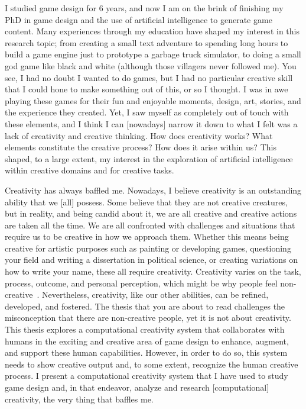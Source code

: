 I studied game design for 6 years, and now I am on the brink of finishing my PhD in game design and the use of artificial intelligence to generate game content. Many experiences through my education have shaped my interest in this research topic; from creating a small text adventure to spending long hours to build a game engine just to prototype a garbage truck simulator, to doing a small god game like black and white (although those villagers never followed me). You see, I had no doubt I wanted to do games, but I had no particular creative skill that I could hone to make something out of this, or so I thought. I was in awe playing these games for their fun and enjoyable moments, design, art, stories, and the experience they created. Yet, I saw myself as completely out of touch with these elements, and I think I can [nowadays] narrow it down to what I felt was a lack of creativity and creative thinking. How does creativity works? What elements constitute the creative process? How does it arise within us? This shaped, to a large extent, my interest in the exploration of artificial intelligence within creative domains and for creative tasks.

Creativity has always baffled me. Nowadays, I believe creativity is an outstanding ability that we [all] possess. Some believe that they are not creative creatures, but in reality, and being candid about it, we are all creative and creative actions are taken all the time. We are all confronted with challenges and situations that require us to be creative in how we approach them. Whether this means being creative for artistic purposes such as painting or developing games, questioning your field and writing a dissertation in political science, or creating variations on how to write your name, these all require creativity. Creativity varies on the task, process, outcome, and personal perception, which might be why people feel non-creative~\cite{kaufman_beyond_2009}. Nevertheless, creativity, like our other abilities, can be refined, developed, and fostered. The thesis that you are about to read challenges the misconception that there are non-creative people, yet it is not about creativity. This thesis explores a computational creativity system that collaborates with humans in the exciting and creative area of game design to enhance, augment, and support these human capabilities. However, in order to do so, this system needs to show creative output and, to some extent, recognize the human creative process. I present a computational creativity system that I have used to study game design and, in that endeavor, analyze and research [computational] creativity, the very thing that baffles me.

